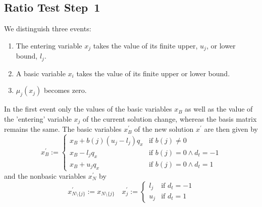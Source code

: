 \documentclass[a4paper]{article}
\begin{document}
\subsection{Ratio Test Step~1}
We distinguish three events:
\begin{enumerate}
\item The entering variable $x_{j}$ takes the value of its finite upper,
$u_{j}$, or lower bound, $l_{j}$.
\item A basic variable $x_{i}$ takes the value of its finite upper or lower bound.
\item $\mu_{j}(x_{j})$ becomes zero.
\end{enumerate}
In the first event only the values of the basic variables $x_{B}$ as well as 
the value of the 'entering' variable $x_{j}$ of the current solution change, whereas the basis matrix remains the same. The basic variables $x_{B}^{\prime}$ of the new solution $x^{\prime}$ are then given by
\begin{equation}
x_{B}^{\prime}:=
\left\{
\begin{array}{ll}
x_{B} + b(j)\left(u_{j}-l_{j}\right)q_{x}
&
\text{if $b(j) \neq 0$} \\
x_{B} - l_{j}q_{x}
&
\text{if $b(j)=0 \wedge d_{t}=-1$} \\
x_{B} + u_{j}q_{x}
&
\text{if $b(j)=0\wedge d_{t}=1$}
\end{array}
\right.
\end{equation}
and the nonbasic variables $x_{N}^{\prime}$ by
\begin{equation}
x_{N \setminus\{j\}}^{\prime}:=x_{N \setminus \{j\}}
\quad
x_{j}^{\prime}:=
\left\{
\begin{array}{ll}
l_{j} 
&
\text{if $d_{t}=-1$} \\
u_{j}
&
\text{if $d_{t}=1$} 
\end{array}
\right.
\end{equation}
\end{document}
